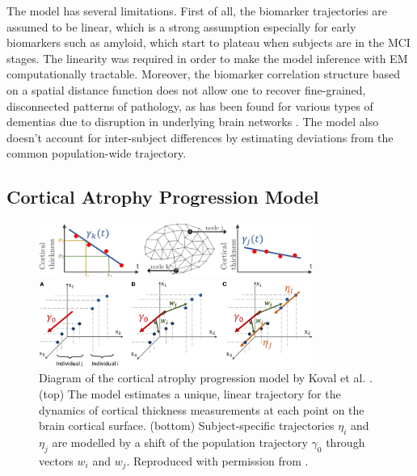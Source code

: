The model has several limitations. First of all, the biomarker trajectories are assumed to be linear, which is a strong assumption especially for early biomarkers such as amyloid, which start to plateau when subjects are in the MCI stages. The linearity was required in order to make the model inference with EM computationally tractable. Moreover, the biomarker correlation structure based on a spatial distance function does not allow one to recover fine-grained, disconnected patterns of pathology, as has been found for various types of dementias due to disruption in underlying brain networks \cite{seeley2009neurodegenerative}. The model also doesn't account for inter-subject differences by estimating deviations from the common population-wide trajectory.

\subsection{Cortical Atrophy Progression Model}
\label{sec:bckCor}

\begin{figure}
\centering
\includegraphics[width=0.8\textwidth]{images/kovalDiag1}

\vspace{2em}
\includegraphics[width=0.8\textwidth]{images/kovalDiag2}
\caption[Diagram of the cortical atrophy progression model by Koval et al. \cite{koval2017statistical}]{Diagram of the cortical atrophy progression model by Koval et al. \cite{koval2017statistical}. (top) The model estimates a unique, linear trajectory for the dynamics of cortical thickness measurements at each point on the brain cortical surface. (bottom) Subject-specific trajectories $\eta_i$ and $\eta_j$ are modelled by a shift of the population trajectory $\gamma_0$ through vectors $w_i$ and $w_j$. Reproduced with permission from \cite{koval2017statistical}.}
\label{fig:bckKov}
\end{figure}

